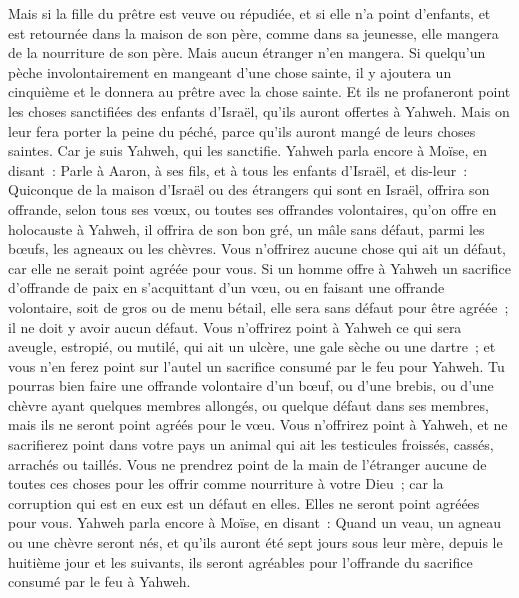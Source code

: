 \begin{multicols}{2}
Mais si la fille du prêtre est veuve ou répudiée, et si elle n'a point d'enfants, et est retournée dans la maison de son père, comme dans sa jeunesse, elle mangera de la nourriture de son père. Mais aucun étranger n'en mangera.
Si quelqu'un pèche involontairement en mangeant d'une chose sainte, il y ajoutera un cinquième et le donnera au prêtre avec la chose sainte.
Et ils ne profaneront point les choses sanctifiées des enfants d'Israël, qu'ils auront offertes à Yahweh.
Mais on leur fera porter la peine du péché, parce qu'ils auront mangé de leurs choses saintes. Car je suis Yahweh, qui les sanctifie.
Yahweh parla encore à Moïse, en disant~:
Parle à Aaron, à ses fils, et à tous les enfants d'Israël, et dis-leur~: Quiconque de la maison d'Israël ou des étrangers qui sont en Israël, offrira son offrande, selon tous ses vœux, ou toutes ses offrandes volontaires, qu'on offre en holocauste à Yahweh,
il offrira de son bon gré, un mâle sans défaut, parmi les bœufs, les agneaux ou les chèvres.
Vous n'offrirez aucune chose qui ait un défaut, car elle ne serait point agréée pour vous.
Si un homme offre à Yahweh un sacrifice d'offrande de paix en s'acquittant d'un vœu, ou en faisant une offrande volontaire, soit de gros ou de menu bétail, elle sera sans défaut pour être agréée~; il ne doit y avoir aucun défaut.
Vous n'offrirez point à Yahweh ce qui sera aveugle, estropié, ou mutilé, qui ait un ulcère, une gale sèche ou une dartre~; et vous n'en ferez point sur l'autel un sacrifice consumé par le feu pour Yahweh.
Tu pourras bien faire une offrande volontaire d'un bœuf, ou d'une brebis, ou d'une chèvre ayant quelques membres allongés, ou quelque défaut dans ses membres, mais ils ne seront point agréés pour le vœu.
Vous n'offrirez point à Yahweh, et ne sacrifierez point dans votre pays un animal qui ait les testicules froissés, cassés, arrachés ou taillés.
Vous ne prendrez point de la main de l'étranger aucune de toutes ces choses pour les offrir comme nourriture à votre Dieu~; car la corruption qui est en eux est un défaut en elles. Elles ne seront point agréées pour vous.
Yahweh parla encore à Moïse, en disant~:
Quand un veau, un agneau ou une chèvre seront nés, et qu'ils auront été sept jours sous leur mère, depuis le huitième jour et les suivants, ils seront agréables pour l'offrande du sacrifice consumé par le feu à Yahweh.

\end{multicols}
